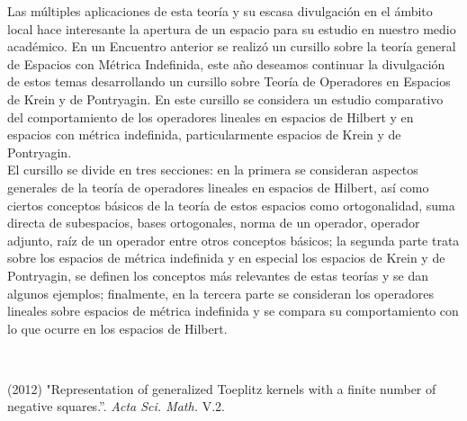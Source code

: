\begin{titlepage}
\begin{minipage}{0.85\linewidth}
\begin{minipage}{0.85\linewidth}
\begin{resumen}
Las m\'ultiples aplicaciones de esta teor\'ia y su escasa divulgaci\'on  en el \'ambito local hace interesante la apertura de un espacio para su estudio en nuestro medio acad\'emico.  En un Encuentro anterior se realiz\'o un cursillo sobre la teor\'ia general de Espacios con M\'etrica Indefinida, este a\~no deseamos continuar la divulgaci\'on de estos temas desarrollando un cursillo sobre Teor\'ia de Operadores en Espacios de Krein y de Pontryagin. En este cursillo se considera un estudio comparativo del comportamiento de los operadores lineales en espacios de Hilbert y en espacios con m\'etrica indefinida, particularmente espacios de Krein y de Pontryagin.\\
El cursillo se divide en tres secciones: en la primera se consideran aspectos generales de la teor\'ia de operadores lineales en espacios de  Hilbert, as\'i como ciertos conceptos b\'asicos de la teor\'ia de estos espacios como ortogonalidad, suma directa de subespacios, bases ortogonales, norma de un operador, operador adjunto, ra\'iz de un operador entre otros conceptos b\'asicos; la segunda parte trata sobre los espacios de m\'etrica indefinida y en especial los espacios de Krein y de Pontryagin, se definen los conceptos m\'as relevantes de estas teor\'ias y se dan algunos ejemplos; finalmente, en la tercera parte se consideran los operadores lineales sobre espacios de m\'etrica indefinida y se compara su comportamiento con lo que ocurre en los espacios de Hilbert.
    \end{resumen}
   \end{minipage}
   \vspace{10pt}
\end{minipage}
\vspace{10pt}\\[5pt]
  \vspace{10pt}
\begin{thebibliography}{99}
    

    

 { (2012) "Representation of generalized Toeplitz kernels with a finite number of negative squares.''. \emph{Acta Sci. Math.} V.2.}
\end{thebibliography}
\end{titlepage}

